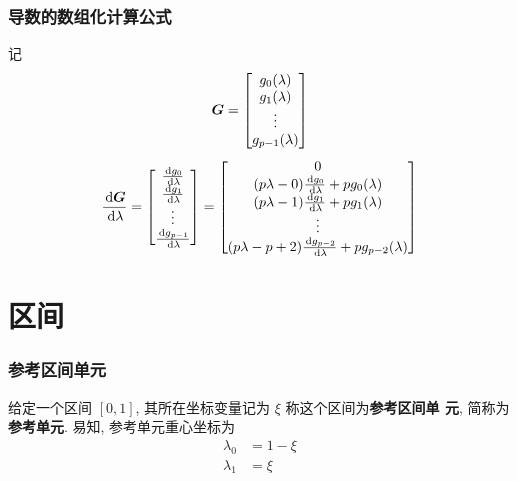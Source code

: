 \documentclass{beamer}
\numberwithin{subsection}{section}
\begin{document}
\begin{frame}
    \frametitle{导数的数组化计算公式}
    记
    $$
        {\boldsymbol G} = 
        \begin{bmatrix}
            g_0(\lambda) \\ g_1(\lambda) \\ \vdots \\ g_{p-1}(\lambda)
        \end{bmatrix}
    $$
    \begin{equation*}
        \frac{\,\mathrm d {\boldsymbol G}}{\,\mathrm d \lambda} = 
        \begin{bmatrix}
             \frac{\,\mathrm d g_0}{\,\mathrm d \lambda}    \\ 
             \frac{\,\mathrm d g_1}{\,\mathrm d \lambda}    \\ 
             \vdots \\ 
             \frac{\,\mathrm d g_{p-1}}{\,\mathrm d \lambda}
        \end{bmatrix}
        =
        \begin{bmatrix}
             0    \\ 
             (p\lambda - 0)\frac{\,\mathrm d g_{0}}{\,\mathrm d \lambda} + pg_{0}(\lambda)   \\ 
             (p\lambda - 1)\frac{\,\mathrm d g_{1}}{\,\mathrm d \lambda} + pg_{1}(\lambda)   \\ 
             \vdots \\ 
             (p\lambda - p + 2)\frac{\,\mathrm d g_{p-2}}{\,\mathrm d \lambda} + pg_{p-2}(\lambda)   \\ 
        \end{bmatrix}
    \end{equation*}
\end{frame}


\section{区间}
\begin{frame}
    \frametitle{参考区间单元}
    给定一个区间 $[0,1]$, 其所在坐标变量记为 $\xi$ 称这个区间为{\bf 参考区间单
    元}, 简称为{\bf 参考单元}.  易知, 参考单元重心坐标为
    \begin{align*}
        \lambda_0 &= 1 - \xi\\
        \lambda_1 &= \xi\\
    \end{align*}
\end{frame}
\end{document}
